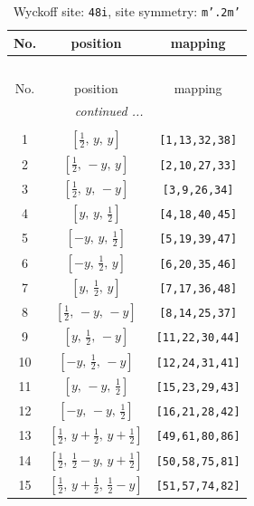\documentclass[fleqn,8pt]{jsarticle}
\begin{document}
\begin{longtable}{ccc}
\caption{Wyckoff site: {\tt 48i}, site symmetry: {\tt m'.2m'}}
 \\
 \hline \hline
No. & position & mapping \\ \hline \endfirsthead

\multicolumn{2}{l}{\tablename\ \thetable{}} \\
 \hline \hline
No. & position & mapping \\ \hline \endhead

 \hline \hline
\multicolumn{2}{r}{\footnotesize\it continued ...} \\ \endfoot

 \hline \hline
\multicolumn{2}{r}{} \\ \endlastfoot

1 & $\left[ \frac{1}{2},\, y,\, y \right]$ & {\tt [1,13,32,38]} \\ \hline
2 & $\left[ \frac{1}{2},\, - y,\, y \right]$ & {\tt [2,10,27,33]} \\ \hline
3 & $\left[ \frac{1}{2},\, y,\, - y \right]$ & {\tt [3,9,26,34]} \\ \hline
4 & $\left[ y,\, y,\, \frac{1}{2} \right]$ & {\tt [4,18,40,45]} \\ \hline
5 & $\left[ - y,\, y,\, \frac{1}{2} \right]$ & {\tt [5,19,39,47]} \\ \hline
6 & $\left[ - y,\, \frac{1}{2},\, y \right]$ & {\tt [6,20,35,46]} \\ \hline
7 & $\left[ y,\, \frac{1}{2},\, y \right]$ & {\tt [7,17,36,48]} \\ \hline
8 & $\left[ \frac{1}{2},\, - y,\, - y \right]$ & {\tt [8,14,25,37]} \\ \hline
9 & $\left[ y,\, \frac{1}{2},\, - y \right]$ & {\tt [11,22,30,44]} \\ \hline
10 & $\left[ - y,\, \frac{1}{2},\, - y \right]$ & {\tt [12,24,31,41]} \\ \hline
11 & $\left[ y,\, - y,\, \frac{1}{2} \right]$ & {\tt [15,23,29,43]} \\ \hline
12 & $\left[ - y,\, - y,\, \frac{1}{2} \right]$ & {\tt [16,21,28,42]} \\ \hline
13 & $\left[ \frac{1}{2},\, y + \frac{1}{2},\, y + \frac{1}{2} \right]$ & {\tt [49,61,80,86]} \\ \hline
14 & $\left[ \frac{1}{2},\, \frac{1}{2} - y,\, y + \frac{1}{2} \right]$ & {\tt [50,58,75,81]} \\ \hline
15 & $\left[ \frac{1}{2},\, y + \frac{1}{2},\, \frac{1}{2} - y \right]$ & {\tt [51,57,74,82]} \\ \hline

\end{longtable}
\end{document}
